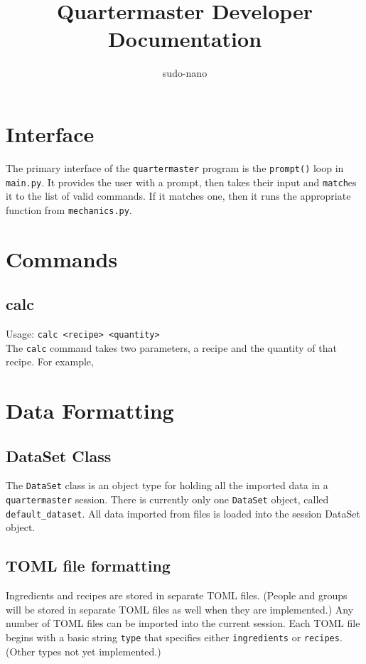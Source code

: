 \documentclass{article}
\title{Quartermaster Developer Documentation}
\author{sudo-nano}
\begin{document}
\maketitle

\tableofcontents

\section{Interface}
The primary interface of the \verb|quartermaster| program is the \verb|prompt()| loop in \verb|main.py|. It provides the user with a prompt, then takes their input and \verb|match|es it to the list of valid commands. If it matches one, then it runs the appropriate function from \verb|mechanics.py|. 


\section{Commands}

\subsection{calc}
Usage: \verb|calc <recipe> <quantity>| \\

The \verb|calc| command takes two parameters, a recipe and the quantity of that recipe. For example, 

\section{Data Formatting}

\subsection{DataSet Class}
The \verb|DataSet| class is an object type for holding all the imported data in a \verb|quartermaster| session. There is currently only one \verb|DataSet| object, called \verb|default_dataset|. 
All data imported from files is loaded into the session DataSet object. 

\subsection{TOML file formatting}
Ingredients and recipes are stored in separate TOML files. (People and groups will be stored in separate TOML files as well when they are implemented.)
Any number of TOML files can be imported into the current session. Each TOML file begins with a basic string \verb|type| that specifies
either \verb|ingredients| or \verb|recipes|. (Other types not yet implemented.)
\end{document}
